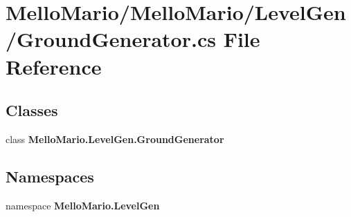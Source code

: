 \section{Mello\+Mario/\+Mello\+Mario/\+Level\+Gen/\+Ground\+Generator.cs File Reference}
\label{GroundGenerator_8cs}
\subsection*{Classes}
\begin{DoxyCompactItemize}
\item 
class \textbf{ Mello\+Mario.\+Level\+Gen.\+Ground\+Generator}
\end{DoxyCompactItemize}
\subsection*{Namespaces}
\begin{DoxyCompactItemize}
\item 
namespace \textbf{ Mello\+Mario.\+Level\+Gen}
\end{DoxyCompactItemize}
